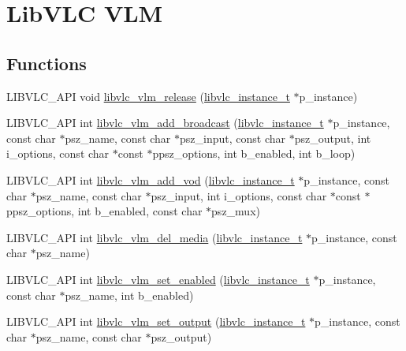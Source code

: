 \hypertarget{group__libvlc__vlm}{}\section{Lib\+V\+LC V\+LM}
\label{group__libvlc__vlm}
\subsection*{Functions}
\begin{DoxyCompactItemize}
\item 
L\+I\+B\+V\+L\+C\+\_\+\+A\+PI void \hyperlink{group__libvlc__vlm_ga2ccd4f533e38fef695cedfcf2ad9138e}{libvlc\+\_\+vlm\+\_\+release} (\hyperlink{group__libvlc__core_ga316d739a80da4678206c79f4d6c2e284}{libvlc\+\_\+instance\+\_\+t} $\ast$p\+\_\+instance)
\item 
L\+I\+B\+V\+L\+C\+\_\+\+A\+PI int \hyperlink{group__libvlc__vlm_gaa8d58569f07229edabe9fdaab41b1c3d}{libvlc\+\_\+vlm\+\_\+add\+\_\+broadcast} (\hyperlink{group__libvlc__core_ga316d739a80da4678206c79f4d6c2e284}{libvlc\+\_\+instance\+\_\+t} $\ast$p\+\_\+instance, const char $\ast$psz\+\_\+name, const char $\ast$psz\+\_\+input, const char $\ast$psz\+\_\+output, int i\+\_\+options, const char $\ast$const $\ast$ppsz\+\_\+options, int b\+\_\+enabled, int b\+\_\+loop)
\item 
L\+I\+B\+V\+L\+C\+\_\+\+A\+PI int \hyperlink{group__libvlc__vlm_gab8926d17d29609bb01c852f83c292a46}{libvlc\+\_\+vlm\+\_\+add\+\_\+vod} (\hyperlink{group__libvlc__core_ga316d739a80da4678206c79f4d6c2e284}{libvlc\+\_\+instance\+\_\+t} $\ast$p\+\_\+instance, const char $\ast$psz\+\_\+name, const char $\ast$psz\+\_\+input, int i\+\_\+options, const char $\ast$const $\ast$ppsz\+\_\+options, int b\+\_\+enabled, const char $\ast$psz\+\_\+mux)
\item 
L\+I\+B\+V\+L\+C\+\_\+\+A\+PI int \hyperlink{group__libvlc__vlm_gaa8740e4ab89a753b3075240d0ec3f2fd}{libvlc\+\_\+vlm\+\_\+del\+\_\+media} (\hyperlink{group__libvlc__core_ga316d739a80da4678206c79f4d6c2e284}{libvlc\+\_\+instance\+\_\+t} $\ast$p\+\_\+instance, const char $\ast$psz\+\_\+name)
\item 
L\+I\+B\+V\+L\+C\+\_\+\+A\+PI int \hyperlink{group__libvlc__vlm_ga89b07022c1bcde4f36d850bde002cca5}{libvlc\+\_\+vlm\+\_\+set\+\_\+enabled} (\hyperlink{group__libvlc__core_ga316d739a80da4678206c79f4d6c2e284}{libvlc\+\_\+instance\+\_\+t} $\ast$p\+\_\+instance, const char $\ast$psz\+\_\+name, int b\+\_\+enabled)
\item 
L\+I\+B\+V\+L\+C\+\_\+\+A\+PI int \hyperlink{group__libvlc__vlm_ga6fab4609f8c9025ae83b24c477a290be}{libvlc\+\_\+vlm\+\_\+set\+\_\+output} (\hyperlink{group__libvlc__core_ga316d739a80da4678206c79f4d6c2e284}{libvlc\+\_\+instance\+\_\+t} $\ast$p\+\_\+instance, const char $\ast$psz\+\_\+name, const char $\ast$psz\+\_\+output)

\end{DoxyCompactItemize}
